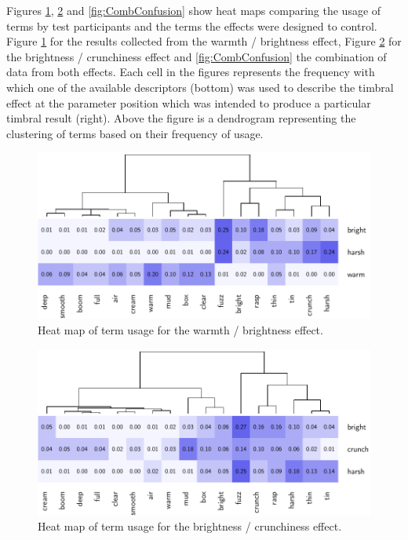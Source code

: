 			Figures \ref{fig:HarshConfusion}, \ref{fig:CrunchConfusion} and \ref{fig:CombConfusion} show heat
			maps comparing the usage of terms by test participants and the terms the effects were designed to
			control. Figure \ref{fig:HarshConfusion} for the results collected from the warmth / brightness
			effect, Figure \ref{fig:CrunchConfusion} for the brightness / crunchiness effect and
			\ref{fig:CombConfusion} the combination of data from both effects. Each cell in the figures
			represents the frequency with which one of the available descriptors (bottom) was used to describe
			the timbral effect at the parameter position which was intended to produce a particular timbral
			result (right). Above the figure is a dendrogram representing the clustering of terms based on
			their frequency of usage.

			\begin{figure}[h!]
				\centering
				\includegraphics{chapter7/Images/HarshConfusion.pdf}
				\caption{Heat map of term usage for the warmth / brightness effect.}
				\label{fig:HarshConfusion}
			\end{figure}

			\begin{figure}[h!]
				\centering
				\includegraphics{chapter7/Images/CrunchConfusion.pdf}
				\caption{Heat map of term usage for the brightness / crunchiness effect.}
				\label{fig:CrunchConfusion}
			\end{figure}

